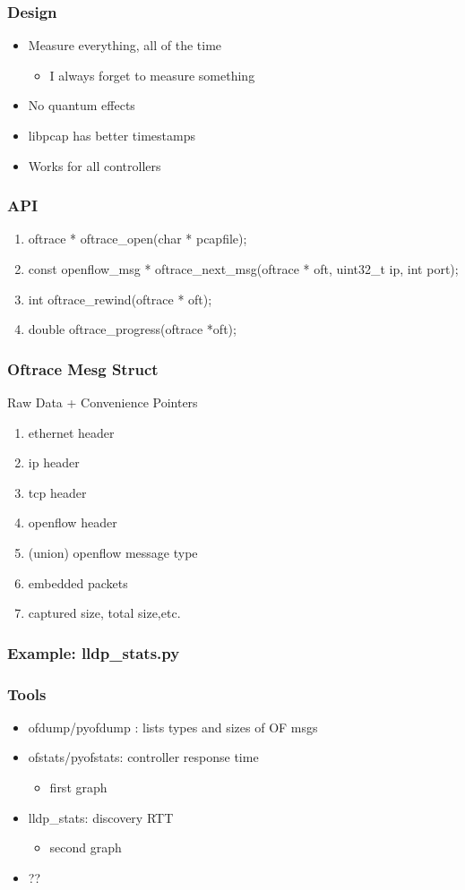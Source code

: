 \documentclass[14pt]{beamer}
\newcommand{\subbullet}[1]{\begin{itemize}\item #1\end{itemize}}
\begin{document}
\begin{frame}
\frametitle{Design}
\begin{itemize}
\item Measure everything, all of the time
\subbullet{I always forget to measure {\red something}}
\item No quantum effects
\item libpcap has better timestamps
\item Works for all controllers
\end{itemize}
\end{frame}
\begin{frame}
\frametitle{API}
\begin{enumerate}
\item oftrace * {\blue oftrace\_open}(char * pcapfile);
\item const openflow\_msg * {\blue oftrace\_next\_msg}(oftrace * oft, uint32\_t ip, int port);
\item int {\blue oftrace\_rewind}(oftrace * oft);
\item double {\blue oftrace\_progress}(oftrace *oft);
\end{enumerate}
\end{frame}
\begin{frame}
\frametitle{Oftrace Mesg Struct}
Raw Data + Convenience Pointers
\begin{enumerate}
\item ethernet header
\item ip header
\item tcp header
\item openflow header
\item (union) openflow message type
\item embedded packets
\item captured size, total size,etc.
\end{enumerate}
\end{frame}
\begin{frame}
\frametitle{Example: lldp\_stats.py}
\end{frame}
\begin{frame}
\frametitle{Tools}
\begin{itemize}
\item ofdump/pyofdump : lists types and sizes of OF msgs
\item ofstats/pyofstats: controller response time
\subbullet{first graph}
\item lldp\_stats: discovery RTT
\subbullet{second graph}
\item ??
\end{itemize}
\end{frame}
\end{document}
